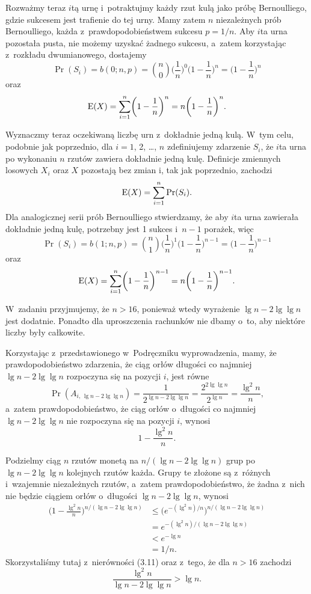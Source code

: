 Rozważmy teraz $i$\nbhyphen tą urnę i~potraktujmy każdy rzut kulą jako próbę Bernoulliego, gdzie sukcesem jest trafienie do tej urny.
Mamy zatem $n$ niezależnych prób Bernoulliego, każda z~prawdopodobieństwem sukcesu $p=1/n$.
Aby $i$\nbhyphen ta urna pozostała pusta, nie możemy uzyskać żadnego sukcesu, a~zatem korzystając z~rozkładu dwumianowego, dostajemy
\[
	\Pr(S_i) = b(0;n,p) = \binom{n}{0}\biggl(\frac{1}{n}\biggr)^0\biggl(1-\frac{1}{n}\biggr)^n = \biggl(1-\frac{1}{n}\biggr)^n
\]
oraz
\[
	\operatorname{E}(X) = \sum_{i=1}^n\biggl(1-\frac{1}{n}\biggr)^n = n\biggl(1-\frac{1}{n}\biggr)^n.
\]

Wyznaczmy teraz oczekiwaną liczbę urn z~dokładnie jedną kulą.
W~tym celu, podobnie jak poprzednio, dla $i=1$, 2, \dots, $n$ zdefiniujemy zdarzenie $S_i$, że $i$\nbhyphen ta urna po wykonaniu $n$ rzutów zawiera dokładnie jedną kulę.
Definicje zmiennych losowych $X_i$ oraz $X$ pozostają bez zmian i, tak jak poprzednio, zachodzi
\[
	\operatorname{E}(X) = \sum_{i=1}^n\Pr(S_i).
\]
Dla analogicznej serii prób Bernoulliego stwierdzamy, że aby $i$\nbhyphen ta urna zawierała dokładnie jedną kulę, potrzebny jest 1 sukces i~$n-1$ porażek, więc
\[
	\Pr(S_i) = b(1;n,p) = \binom{n}{1}\biggl(\frac{1}{n}\biggr)^1\biggl(1-\frac{1}{n}\biggr)^{n-1} = \biggl(1-\frac{1}{n}\biggr)^{n-1}
\]
oraz
\[
	\operatorname{E}(X) = \sum_{i=1}^n\biggl(1-\frac{1}{n}\biggr)^{n-1} = n\biggl(1-\frac{1}{n}\biggr)^{n-1}.
\]

\exercise %
W~zadaniu przyjmujemy, że $n>16$, ponieważ wtedy wyrażenie $\lg n-2\lg\lg n$ jest dodatnie.
Ponadto dla uproszczenia rachunków nie dbamy o~to, aby niektóre liczby były całkowite.

Korzystając z~przedstawionego w~Podręczniku wyprowadzenia, mamy, że prawdopodobieństwo zdarzenia, że ciąg orłów długości co najmniej $\lg n-2\lg\lg n$ rozpoczyna się na pozycji $i$, jest równe
\[
	\Pr(A_{i,\,\lg n-2\lg\lg n}) = \frac{1}{2^{\lg n-2\lg\lg n}} = \frac{2^{2\lg\lg n}}{2^{\lg n}} = \frac{\lg^2n}{n},
\]
a~zatem prawdopodobieństwo, że ciąg orłów o~długości co najmniej $\lg n-2\lg\lg n$ nie rozpoczyna się na pozycji $i$, wynosi
\[
	1-\frac{\lg^2n}{n}.
\]

Podzielmy ciąg $n$ rzutów monetą na $n/(\lg n-2\lg\lg n)$ grup po $\lg n-2\lg\lg n$ kolejnych rzutów każda.
Grupy te złożone są z~różnych i~wzajemnie niezależnych rzutów, a~zatem prawdopodobieństwo, że żadna z~nich nie będzie ciągiem orłów o~długości $\lg n-2\lg\lg n$, wynosi
\begin{align*}
	\biggl(1-\frac{\lg^2n}{n}\biggr)^{n/(\lg n-2\lg\lg n)} &\le \bigl(e^{-(\lg^2n)/n}\bigr)^{n/(\lg n-2\lg\lg n)} \\
	&= e^{-(\lg^2n)/(\lg n-2\lg\lg n)} \\
	&< e^{-\lg n} \\
	&= 1/n.
\end{align*}
Skorzystaliśmy tutaj z~nierówności (3.11) oraz z~tego, że dla $n>16$ zachodzi
\[
	\frac{\lg^2n}{\lg n-2\lg\lg n} > \lg n.
\]
